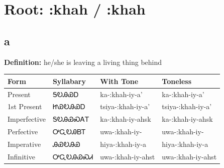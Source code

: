 \documentclass{article}%
\begin{document}
%
\normalsize%
\section*{Root: :khah / :khah}%
\subsection*{a}%
\textbf{Definition: }%
he/she is leaving a living thing behind%
\\[0.5em]%
\begin{tabular}{|l|l|l|l|}%
\hline%
\textbf{Form}&\textbf{Syllabary}&\textbf{With Tone}&\textbf{Toneless}\\%
\hline%
Present&ᎦᎧᎯᏯᎠ&ka{-}:khah{-}iy{-}a'&ka{-}:khah{-}iy{-}a'\\%
1st Present&ᏥᏯᎧᎯᏯᎠ&tsiya{-}:khah{-}iy{-}a'&tsiya{-}:khah{-}iy{-}a'\\%
Imperfective&ᎦᎧᎯᏯᏍᎪᎢ&ka{-}:khah{-}iy{-}ahsk&ka{-}:khah{-}iy{-}ahsk\\%
Perfective&ᎤᏩᎧᎯᏴᎢ&uwa{-}:khah{-}iy{-}&uwa{-}:khah{-}iy{-}\\%
Imperative&ᎯᏯᎧᎯᏯ&hiya{-}:khah{-}iy{-}a&hiya{-}:khah{-}iy{-}a\\%
Infinitive&ᎤᏩᎧᎯᏯᏍᏗ&uwa{-}:khah{-}iy{-}ahst&uwa{-}:khah{-}iy{-}ahst\\%
\hline%
\end{tabular}%
\\[1em]%
\end{document}
